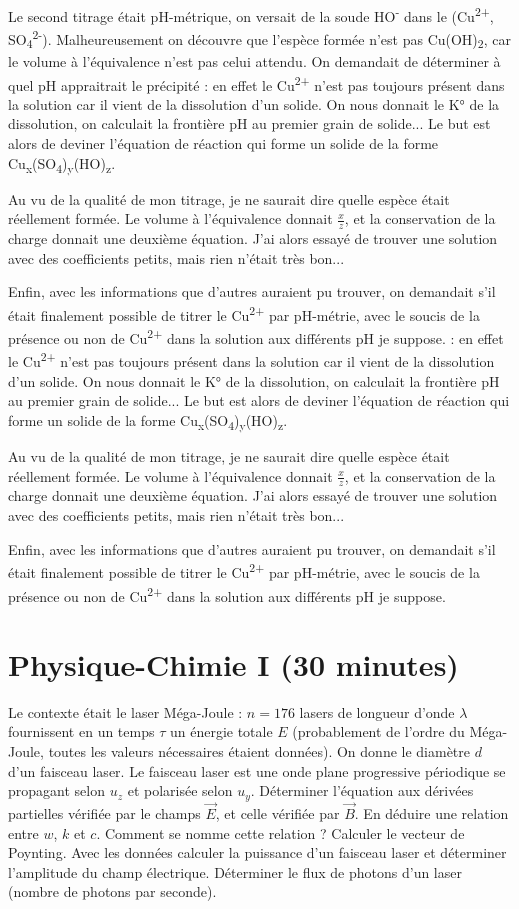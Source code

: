 \documentclass[french,a4paper, 12pt]{article}
\renewcommand{\up}{\textsuperscript}
\newcommand{\dw}{\textsubscript}
\begin{document}
Le second titrage était pH-métrique, on versait de la soude HO\up{-} dans le (Cu\up{2+}, SO\dw{4}\up{2-}). Malheureusement on découvre que l'espèce formée n'est pas Cu(OH)\dw{2}, car le volume à l'équivalence n'est pas celui attendu. On demandait de déterminer à quel pH appraitrait le précipité : en effet le Cu\up{2+} n'est pas toujours présent dans la solution car il vient de la dissolution d'un solide. On nous donnait le K° de la dissolution, on calculait la frontière pH au premier grain de solide... Le but est alors de deviner l'équation de réaction qui forme un solide de la forme Cu\dw{x}(SO\dw{4})\dw{y}(HO)\dw{z}.

Au vu de la qualité de mon titrage, je ne saurait dire quelle espèce était réellement formée. Le volume à l'équivalence donnait $\frac{x}{z}$, et la conservation de la charge donnait une deuxième équation. J'ai alors essayé de trouver une solution avec des coefficients petits, mais rien n'était très bon...

Enfin, avec les informations que d'autres auraient pu trouver, on demandait s'il était finalement possible de titrer le Cu\up{2+} par pH-métrie, avec le soucis de la présence ou non de Cu\up{2+} dans la solution aux différents pH je suppose.   : en effet le Cu\up{2+} n'est pas toujours présent dans la solution car il vient de la dissolution d'un solide. On nous donnait le K° de la dissolution, on calculait la frontière pH au premier grain de solide... Le but est alors de deviner l'équation de réaction qui forme un solide de la forme Cu\dw{x}(SO\dw{4})\dw{y}(HO)\dw{z}.

Au vu de la qualité de mon titrage, je ne saurait dire quelle espèce était réellement formée. Le volume à l'équivalence donnait $\frac{x}{z}$, et la conservation de la charge donnait une deuxième équation. J'ai alors essayé de trouver une solution avec des coefficients petits, mais rien n'était très bon...

Enfin, avec les informations que d'autres auraient pu trouver, on demandait s'il était finalement possible de titrer le Cu\up{2+} par pH-métrie, avec le soucis de la présence ou non de Cu\up{2+} dans la solution aux différents pH je suppose.  

\section*{Physique-Chimie I (30 minutes)}
Le contexte était le laser Méga-Joule : $n=176$ lasers de longueur d'onde $\lambda$ fournissent en un temps $\tau$ un énergie totale $E$ (probablement de l'ordre du Méga-Joule, toutes les valeurs nécessaires étaient données). On donne le diamètre $d$ d'un faisceau laser. Le faisceau laser est une onde plane progressive périodique se propagant selon $u_z$ et polarisée selon $u_y$. Déterminer l'équation aux dérivées partielles vérifiée par le champs $\vec{E}$, et celle vérifiée par $\vec{B}$. En déduire une relation entre $w$, $k$ et $c$. Comment se nomme cette relation ? Calculer le vecteur de Poynting. Avec les données calculer la puissance d'un faisceau laser et déterminer l'amplitude du champ électrique. Déterminer le flux de photons d'un laser (nombre de photons par seconde).
\end{document}
